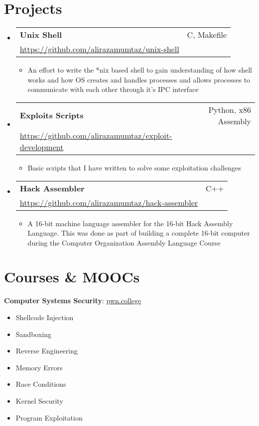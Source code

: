 \documentclass[letterpaper,11pt]{article}
\makeatletter
\newcommand{\resumeItem}[1]{
  \item{
    {#1 \vspace{-4pt}}
  }
}
\newcommand{\resumeSubheading}[4]{
  \vspace{-2pt}\item
    \begin{tabular*}{0.97\textwidth}[t]{l@{\extracolsep{\fill}}r}
      \textbf{#1} & #2 \\
      {\small #3} & {\small #4} \\
    \end{tabular*}\vspace{-10pt}
}
\newcommand{\resumeSubHeadingListStart}{\begin{itemize}[leftmargin=0.15in, label={}]}
\newcommand{\resumeSubHeadingListEnd}{\end{itemize}}
\newcommand{\resumeItemListStart}{\begin{itemize}}
\newcommand{\resumeItemListEnd}{\end{itemize}\vspace{-2pt}}
\makeatother
\begin{document}
\section{Projects}
\resumeSubHeadingListStart
    
        
        \resumeSubheading
            {Unix Shell}{C, Makefile}
            {\href{https://github.com/alirazamumtaz/system-programming/tree/master/linux-shell}{https://github.com/alirazamumtaz/unix-shell}}{}
            \resumeItemListStart
                \resumeItem{An effort to write the *nix based shell to gain understanding of how shell works and how OS creates and handles processes and allows processes to communicate with each other through it's IPC interface}
            \resumeItemListEnd
        
        \resumeSubheading
            {Exploits Scripts}{Python, x86 Assembly}
            {\href{https://github.com/alirazamumtaz/exploit-development}{https://github.com/alirazamumtaz/exploit-development}}{}
            \resumeItemListStart
                \resumeItem{Basic scripts that I have written to solve some exploitation challenges}
            \resumeItemListEnd
        
            \resumeSubheading
            {Hack Assembler}{C++}
            {\href{https://github.com/alirazamumtaz/hack-assembler}{https://github.com/alirazamumtaz/hack-assembler}}{}
            \resumeItemListStart
                \small\resumeItem{A 16-bit machine language assembler for the 16-bit Hack Assembly Language. This was done as part of building a complete 16-bit computer during the Computer Organization Assembly Language Course}
            \resumeItemListEnd

\resumeSubHeadingListEnd

\section{Courses \& MOOCs}
\begin{itemize}[leftmargin=0.15in, label={}]
    \normalsize{\item{
     \textbf{Computer Systems Security}{: \href{https://dojo.pwn.college/cse466/}{pwn.college}} \\
        \resumeItemListStart
            \resumeItem{Shellcode Injection}
            \resumeItem{Sandboxing}
            \resumeItem{Reverse Engineering}
            \resumeItem{Memory Errors}
            \resumeItem{Race Conditions}
            \resumeItem{Kernel Security}
            \resumeItem{Program Exploitation}
        \resumeItemListEnd
    }}
    
 \end{itemize}
\end{document}
